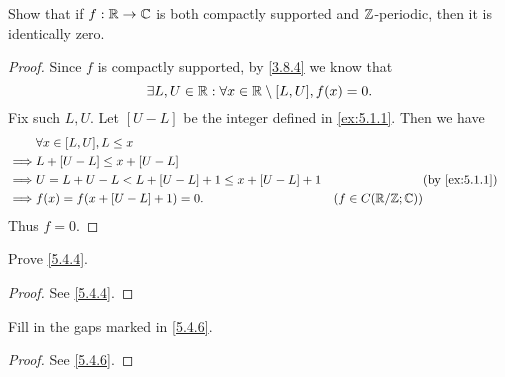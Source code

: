 \exercisesection

\begin{ex}\label{ex:5.4.1}
  Show that if \(f : \mathbb{R} \to \mathbb{C}\) is both compactly supported and \(\mathbb{Z}\)-periodic, then it is identically zero.
\end{ex}

\begin{proof}
  Since \(f\) is compactly supported, by \cref{3.8.4} we know that
  \[
    \exists L, U \in \mathbb{R} : \forall x \in \mathbb{R} \setminus [L, U], f(x) = 0.
  \]
  Fix such \(L, U\).
  Let \([U - L]\) be the integer defined in \cref{ex:5.1.1}.
  Then we have
  \begin{align*}
             & \forall x \in [L, U], L \leq x                                                                 \\
    \implies & L + [U - L] \leq x + [U - L]                                                                   \\
    \implies & U = L + U - L < L + [U - L] + 1 \leq x + [U - L] + 1 &                         & \by{ex:5.1.1} \\
    \implies & f(x) = f(x + [U - L] + 1) = 0.                       & (f \in C(\R / \Z ; \C))
  \end{align*}
  Thus \(f = 0\).
\end{proof}

\begin{ex}\label{ex:5.4.2}
  Prove \cref{5.4.4}.
\end{ex}

\begin{proof}
  See \cref{5.4.4}.
\end{proof}

\begin{ex}\label{ex:5.4.3}
  Fill in the gaps marked in \cref{5.4.6}.
\end{ex}

\begin{proof}
  See \cref{5.4.6}.
\end{proof}
